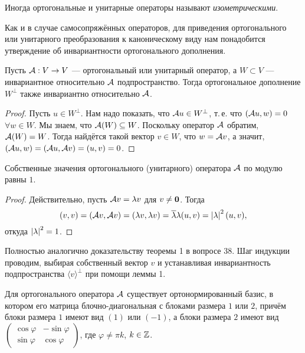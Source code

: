 Иногда ортогональные и унитарные операторы называют \textit{изометрическими}.

Как и в случае самосопряжённых операторов, для приведения ортогонального или унитарного преобразования к каноническому виду нам понадобится утверждение об инвариантности ортогонального дополнения.

\begin{lemma}
    Пусть $\mathcal{A}: V \to V$ --- ортогональный или унитарный оператор, а $W \subset V$ --- инвариантное относительно $\mathcal{A}$ подпространство. Тогда ортогональное дополнение $W^\perp$ также инвариантно относительно $\mathcal{A}$.
\end{lemma}

\begin{proof}
    Пусть $u \in W^\perp$. Нам надо показать, что $\mathcal{A} u \in W^\perp$, т.\,е. что $(\mathcal{A} u, w) = 0$ $\forall w \in W$. Мы знаем, что $\mathcal{A}(W) \subseteq W$. Поскольку оператор $\mathcal{A}$ обратим, $\mathcal{A}(W) = W$. Тогда найдётся такой вектор $v \in W$, что $w = \mathcal{A} v$, а значит, $(\mathcal{A} u, w) = (\mathcal{A} u, \mathcal{A} v) = (u, v) = 0$.
\end{proof}

\begin{lemma}
    Собственные значения ортогонального (унитарного) оператора $\mathcal{A}$ по модулю равны $1$.
\end{lemma}

\begin{proof}
    Действительно, пусть $\mathcal{A} v = \lambda v$ для $v \ne \boldsymbol{0}$. Тогда
    \[
        (v, v) = (\mathcal{A} v, \mathcal{A} v) = (\lambda v, \lambda v) = \overline{\lambda}\lambda(u, v) = \left\lvert\lambda\right\rvert^2(u, v),
    \]
    откуда $\left\lvert\lambda\right\rvert^2 = 1$.
\end{proof}

\begin{theorem}
    Полностью аналогично доказательству теоремы 1 в вопросе 38. Шаг индукции проводим, выбирая собственный вектор $v$ и устанавливая инвариантность подпространства $\langle v\rangle^\perp$ при помощи леммы 1.
\end{theorem}

\begin{theorem}
    Для ортогонального оператора $\mathcal{A}$ существует ортонормированный базис, в котором его матрица блочно-диагональная с блоками размера $1$ или $2$, причём блоки размера $1$ имеют вид $(1)$ или $(-1)$, а блоки размера $2$ имеют вид
    $
    \begin{pmatrix}
        \cos\varphi & -\sin\varphi\\
        \sin\varphi & \cos\varphi
    \end{pmatrix}
    $, где $\varphi \ne \pi k$, $k \in \mathbb{Z}$.
\end{theorem}

